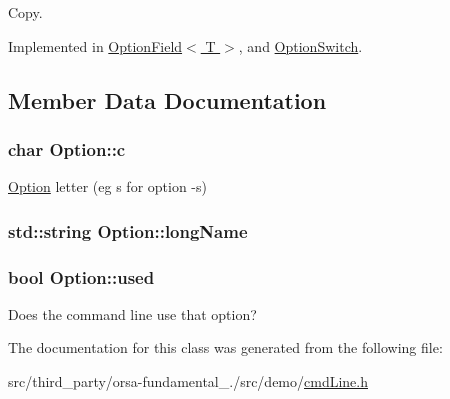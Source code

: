 Copy. 



Implemented in \hyperlink{classOptionField_a44641afd5aae01ff1c440e8d00915f6f}{Option\+Field$<$ T $>$}, and \hyperlink{classOptionSwitch_a339139802b4b9669886e7d5e0b712b47}{Option\+Switch}.



\subsection{Member Data Documentation}
\hypertarget{classOption_a496b793630fcab592951643fe2c651d6}{}
\subsubsection[{c}]{\setlength{\rightskip}{0pt plus 5cm}char Option\+::c}\label{classOption_a496b793630fcab592951643fe2c651d6}


\hyperlink{classOption}{Option} letter (eg \textquotesingle{}s\textquotesingle{} for option -\/s) 

\hypertarget{classOption_aa363ef44784c810db2725419c578dc3d}{}
\subsubsection[{long\+Name}]{\setlength{\rightskip}{0pt plus 5cm}std\+::string Option\+::long\+Name}\label{classOption_aa363ef44784c810db2725419c578dc3d}
\hypertarget{classOption_a5d489d6f18c729f34b37608db593d70a}{}
\subsubsection[{used}]{\setlength{\rightskip}{0pt plus 5cm}bool Option\+::used}\label{classOption_a5d489d6f18c729f34b37608db593d70a}


Does the command line use that option? 



The documentation for this class was generated from the following file\+:\begin{DoxyCompactItemize}
\item 
src/third\+\_\+party/orsa-\/fundamental\+\_./src/demo/\hyperlink{cmdLine_8h}{cmd\+Line.\+h}\end{DoxyCompactItemize}
